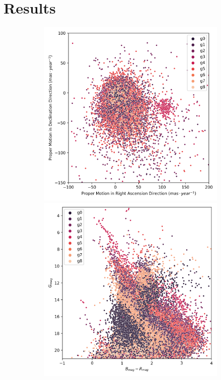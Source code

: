 \documentclass[11pt,a4paper,english,twocolumn]{article}
\begin{document}
\section{Results}
\label{sec:results}

\begin{figure}[!htbp]
  \centering
  \begin{subfigure}[b]{0.3\textwidth}
    \centering
      \includegraphics[width=\textwidth]{../figures/melotte_25/kmeans_pm_melotte_25.png}
      \includegraphics[width=\textwidth]{../figures/melotte_25/kmeans_hr_diagram_melotte_25.png}

\end{subfigure}
\end{figure}
\end{document}
